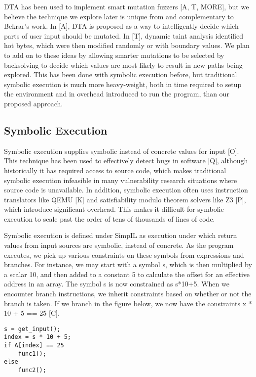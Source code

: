 \documentclass[11pt,expanded,copyright]{fsuthesis}
\begin{document}
DTA has been used to implement smart mutation fuzzers [A, T, MORE], but we believe the technique we explore later is unique from and complementary to Bekrar's work. In [A], DTA is proposed as a way to intelligently decide which parts of user input should be mutated. In [T], dynamic taint analysis identified hot bytes, which were then modified randomly or with boundary values. We plan to add on to these ideas by allowing smarter mutations to be selected by backsolving to decide which values are most likely to result in new paths being explored. This has been done with symbolic execution before, but traditional symbolic execution is much more heavy-weight, both in time required to setup the environment and in overhead introduced to run the program, than our proposed approach.

\subsection{Symbolic Execution}


Symbolic execution supplies symbolic instead of concrete values for input [O]. This technique has been used to effectively detect bugs in software [Q], although historically it has required access to source code, which makes traditional symbolic execution infeasible in many vulnerability research situations where source code is unavailable. In addition, symbolic execution often uses instruction translators like QEMU [K] and satisfiability modulo theorem solvers like Z3 [P], which introduce significant overhead. This makes it difficult for symbolic execution to scale past the order of tens of thousands of lines of code. 

Symbolic execution is defined under SimpIL as execution under which return values from input sources are symbolic, instead of concrete. As the program executes, we pick up various constraints on these symbols from expressions and branches. For instance, we may start with a symbol s, which is then multiplied by a scalar 10, and then added to a constant 5 to calculate the offset for an effective address in an array. The symbol s is now constrained as s*10+5. When we encounter branch instructions, we inherit constraints based on whether or not the branch is taken. If we branch in the figure below, we now have the constraints x * 10 + 5 == 25 [C].

\begin{lstlisting}[style=cstyle]
s = get_input();
index = s * 10 + 5;
if A[index] == 25
	func1();
else
	func2();
\end{lstlisting}
\end{document}
